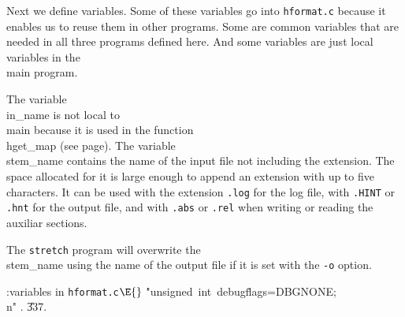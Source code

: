 
Next we define variables.
Some of these variables go into {\tt hformat.c} because
it enables us to reuse them in other programs.
Some are common variables that are
needed in all three programs defined here.
And some variables are just local variables in the \\{main} program.

The variable \\{in\_name} is not local to \\{main} because it is
used in the function \\{hget\_map} (see page\pageref{map}).
The variable \\{stem\_name} contains the name of the input file
not including the extension. The space allocated for it
is large enough to append an extension with up to five characters.
It can be used with the extension {\tt .log} for the log file,
with {\tt .HINT} or {\tt .hnt} for the output file,
and with {\tt .abs} or {\tt .rel} when writing or reading the auxiliar sections.

The {\tt stretch} program will overwrite the \\{stem\_name}
using the name of the output file if it is set with the {\tt -o}
option.

\Y\B\4:variables in {\tt hformat.c}\X${}\E{}$\6
\.{"unsigned\ int\ debugf}\)\.{lags=DBGNONE;\\n"}
.
\U337.\Y
\fi


